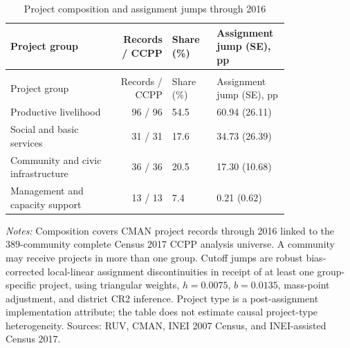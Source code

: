 \begingroup\fontsize{9.25}{11.4}\selectfont
\setlength{\tabcolsep}{3pt}\renewcommand{\arraystretch}{1.18}
\begin{longtable}{@{}>{\raggedright\arraybackslash}p{0.38\linewidth}rp{0.16\linewidth}p{0.26\linewidth}@{}}
\caption{Project composition and assignment jumps through 2016}\label{tab:pub_A08} \\
\toprule Project group & Records / CCPP & Share (\%) & Assignment jump (SE), pp \\ \midrule\endfirsthead
\multicolumn{4}{c}{\tablename\ \thetable{} -- continued} \\
\toprule Project group & Records / CCPP & Share (\%) & Assignment jump (SE), pp \\ \midrule\endhead
Productive livelihood & 96 / 96 & 54.5 & 60.94 (26.11) \\
Social and basic services & 31 / 31 & 17.6 & 34.73 (26.39) \\
Community and civic infrastructure & 36 / 36 & 20.5 & 17.30 (10.68) \\
Management and capacity support & 13 / 13 & 7.4 & 0.21 (0.62) \\
\bottomrule\end{longtable}
\parbox{0.97\linewidth}{\footnotesize \textit{Notes:} Composition covers CMAN project records through 2016 linked to the 389-community complete Census 2017 CCPP analysis universe. A community may receive projects in more than one group. Cutoff jumps are robust bias-corrected local-linear assignment discontinuities in receipt of at least one group-specific project, using triangular weights, \(h=0.0075\), \(b=0.0135\), mass-point adjustment, and district CR2 inference. Project type is a post-assignment implementation attribute; the table does not estimate causal project-type heterogeneity. Sources: RUV, CMAN, INEI 2007 Census, and INEI-assisted Census 2017.}
\par{}\par\endgroup

